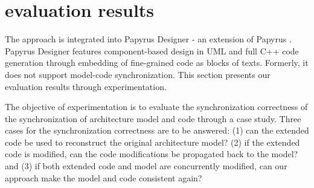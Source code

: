 \section{evaluation results}
\label{sec:evaluationplan}
The approach is integrated into Papyrus Designer - an extension of Papyrus \cite{gerard201019}.
Papyrus Designer features component-based design in UML and full C++ code generation through embedding of fine-grained code as blocks of texts.
Formerly, it does not support model-code synchronization.
This section presents our evaluation results through experimentation. %

\begin {comment}
\subsection{Previous results}
\noindent
\tb{Semantic-conformance:}
We assess the preservation of UML semantics in the code.
In \cite{fullusm}, we show our experiments to test the runtime execution of the code against the precise semantics of UML State Machine standardized by OMG in \cite{PSSM} with a test suite consisting 66 test cases.
62 out of 66 cases passed leaving for future to fix the failed test cases.


\noindent
\tb{Standard code efficiency:}
We target resource-constrained embedded systems.
Hence, event processing speed and memory usage are critical.
We compare the efficiency of the generated code with the code generated by some UML tools and source code libraries in \cite{fullusm}.
The results show that the code in our approach runs fast and requires little memory.
\end{comment}

The objective of experimentation is to evaluate the synchronization correctness of the synchronization of architecture model and code through a case study.
Three cases for the synchronization correctness are to be answered: (1) can the extended code be used to reconstruct the original architecture model? (2) if the extended code is modified, can the code modifications be propagated back to the model? and (3) if both extended code and model are concurrently modified, can our approach make the model and code consistent again?

